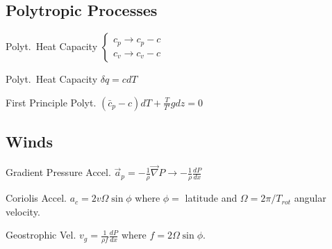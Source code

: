 \documentclass[10pt]{article}
\begin{document}
\begin{multicols}{3}
\subsection{Polytropic Processes}
\begin{ttdesc}[labelwidth=\widthof{\ttfamily{letterpaper/a4paper}}]
\item[Polyt.\ Heat Capacity]  $\left\{ \begin{array}{c} c_p \to c_p-c \\
c_v \to c_v-c \end{array} \right.$
\item[Polyt.\ Heat Capacity] $\delta q = c dT$
\item[First Principle Polyt.] $({\bar c}_p - c) dT + \frac{T}{T'} g dz = 0$
\end{ttdesc}
%
\subsection{Winds}
\begin{ttdesc}[labelwidth=\widthof{\ttfamily{letterpaper}}]
\item[Gradient Pressure Accel.]  $\vec{a}_{p}=-\frac 1 \rho \vec{\nabla}P  \rightarrow -\frac 1 \rho \frac{dP}{dx}$
\item[Coriolis Accel.] $a_c=2 v \Omega \sin\phi$ where $\phi = $ 
  latitude and $\Omega  =2\pi/T_{rot}$ angular velocity.
\item[Geostrophic Vel.] $v_g=\frac{1}{\rho f}\frac{dP}{dx}$ where
$f=2 \Omega \sin\phi$.
\end{ttdesc}




\end{multicols}
\end{document}
